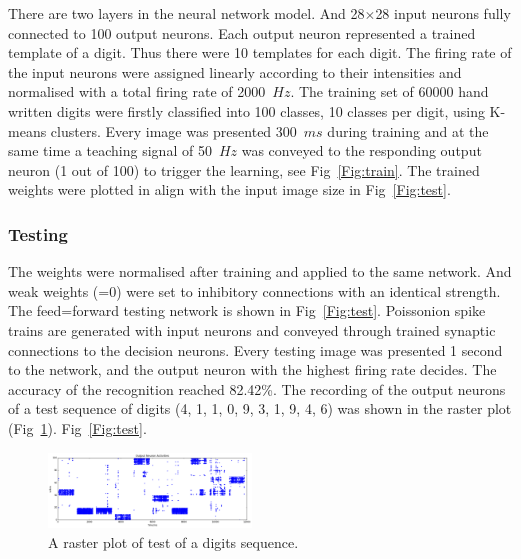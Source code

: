 There are two layers in the neural network model.
And 28$\times$28 input neurons fully connected to 100 output neurons.
Each output neuron represented a trained template of a digit.
Thus there were 10 templates for each digit.
The firing rate of the input neurons were assigned linearly according to their intensities and normalised with a total firing rate of 2000~$Hz$.
The training set of 60000 hand written digits were firstly classified into 100 classes, 10 classes per digit, using K-means clusters.
Every image was presented 300~$ms$ during training and at the same time a teaching signal of 50~$Hz$ was conveyed to the responding output neuron (1 out of 100) to trigger the learning, see Fig~\ref{Fig:train}.
The trained weights were plotted in align with the input image size in Fig~\ref{Fig:test}.



\subsubsection{Testing}
The weights were normalised after training and applied to the same network.
And weak weights (=0) were set to inhibitory connections with an identical strength.
The feed=forward testing network is shown in Fig~\ref{Fig:test}.
Poissonion spike trains are generated with input neurons and conveyed through trained synaptic connections to the decision neurons.
Every testing image was presented 1 second to the network, and the output neuron with the highest firing rate decides.
The accuracy of the recognition reached 82.42\%.%
The recording of the output neurons of a test sequence of digits (4, 1, 1, 0, 9, 3, 1, 9, 4, 6) was shown in the raster plot (Fig~\ref{Fig:output}).
Fig~\ref{Fig:test}.

\begin{figure}[hbt!]
	\centering
	\includegraphics[width=0.48\textwidth]{images/test300-301.pdf}
	\caption{A raster plot of test of a digits sequence.}
	\label{Fig:output}
\end{figure} 
